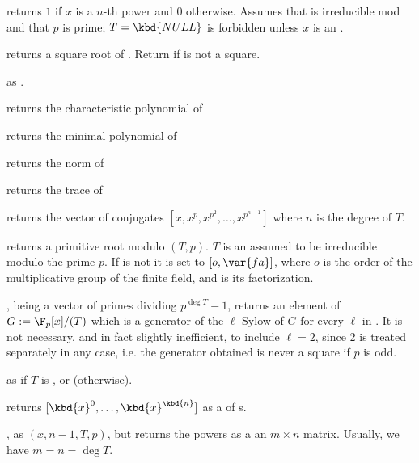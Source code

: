  returns $1$ if $x$
is a $n$-th power and $0$ otherwise. Assumes that  is irreducible mod
 and that $p$ is prime; $T = \kbd{NULL}$ is forbidden unless $x$ is an
.

 returns a square root of .
Return  if  is not a square.

as .

 returns the characteristic
polynomial of 

 returns the minimal polynomial
of 

 returns the norm of 

 returns the trace of 

 returns the vector of conjugates
$[x,x^p,x^{p^2},\ldots,x^{p^{n-1}}]$ where $n$ is the degree of $T$.

 returns a primitive root modulo
$(T,p)$. $T$ is an  assumed to be irreducible modulo the prime
$p$. If  is not  it is set to $[o,\var{fa}]$, where $o$ is
the order of the multiplicative group of the finite field, and  is
its factorization.

,  being a vector of
primes dividing $p^{\deg T} - 1$, returns an element of $G:=\F_p[x]/(T)$
which is a generator of the $\ell$-Sylow of $G$ for every $\ell$ in
. It is not necessary, and in fact slightly inefficient, to include
$\ell=2$, since 2 is treated separately in any case, i.e. the generator
obtained is never a square if $p$ is odd.

 as
 if $T$ is ,
or  (otherwise).


 returns $[\kbd{x}^0,
\dots, \kbd{x}^\kbd{n}]$ as a  of s.

, as
$(x, n-1, T, p)$, but returns the powers as a an
$m\times n$ matrix. Usually, we have $m = n = \deg T$.

